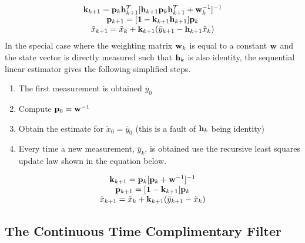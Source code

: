 \documentclass{article}
\begin{document}
\begin{equation}
  \begin{matrix}
    {\bf k}_{k+1} = {\bf p}_{k}{\bf h}_{k+1}^T[{\bf h}_{k+1}{\bf p}_k{\bf h}_{k+1}^T+{\bf w}_k^{-1}]^{-1}\\
    {\bf p}_{k+1} = [{\bf 1} - {\bf k}_{k+1}{\bf h}_{k+1}]{\bf p}_k\\
    \tilde{x}_{k+1} = \tilde{x}_k + {\bf k}_{k+1}(\bar{y}_{k+1} - {\bf h}_{k+1}\tilde{x}_k) \\
  \end{matrix}
\end{equation}
In the special case where the weighting matrix
${\bf w}_k$ is equal to a constant ${\bf w}$ and the state vector is
directly measured such that ${\bf h}_k$ is also identity, the 
sequential linear estimator gives the following simplified steps.
\begin{enumerate}[itemsep=-5pt]
    \item The first measurement is obtained $\bar{y}_0$
    \item Compute ${\bf p}_0 = {\bf w}^{-1}$
    \item Obtain the estimate for $\tilde{x}_0 = \bar{y}_0$ (this is a fault of ${\bf h}_k$ being identity) 
    \item Every time a new measurement, $\bar{y}_k$, is obtained use the recursive least squares update law shown in the equation below.  
\end{enumerate}
\begin{equation}
  \begin{matrix}
    {\bf k}_{k+1} = {\bf p}_k[{\bf p}_k + {\bf w}^{-1}]^{-1}\\ 
    {\bf p}_{k+1} = [{\bf 1} - {\bf k}_{k+1}]{\bf p}_k\\
    \tilde{x}_{k+1} = \tilde{x}_k + {\bf k}_{k+1}(\bar{y}_{k+1} - \tilde{x}_k) \\
  \end{matrix}
\end{equation}

\subsection{The Continuous Time Complimentary Filter}
\end{document}
